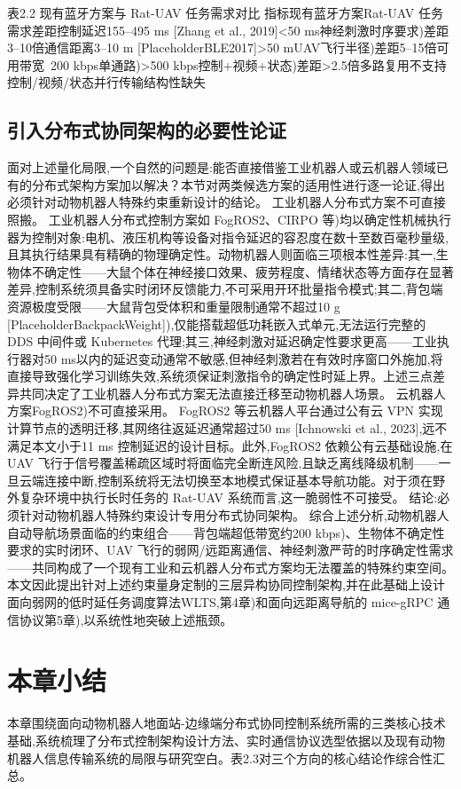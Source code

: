 表2.2 现有蓝牙方案与 Rat-UAV 任务需求对比
指标现有蓝牙方案Rat-UAV 任务需求差距控制延迟155–495 ms [Zhang et al., 2019]<50 ms神经刺激时序要求)差距3–10倍通信距离3–10 m [PlaceholderBLE2017]>50 mUAV飞行半径)差距5–15倍可用带宽~200 kbps单通路)>500 kbps控制+视频+状态)差距>2.5倍多路复用不支持控制/视频/状态并行传输结构性缺失

\subsection{引入分布式协同架构的必要性论证}
面对上述量化局限,一个自然的问题是:能否直接借鉴工业机器人或云机器人领域已有的分布式架构方案加以解决？本节对两类候选方案的适用性进行逐一论证,得出必须针对动物机器人特殊约束重新设计的结论。
工业机器人分布式方案不可直接照搬。 工业机器人分布式控制方案如 FogROS2、CIRPO 等)均以确定性机械执行器为控制对象:电机、液压机构等设备对指令延迟的容忍度在数十至数百毫秒量级,且其执行结果具有精确的物理确定性。动物机器人则面临三项根本性差异:其一,生物体不确定性——大鼠个体在神经接口效果、疲劳程度、情绪状态等方面存在显著差异,控制系统须具备实时闭环反馈能力,不可采用开环批量指令模式;其二,背包端资源极度受限——大鼠背包受体积和重量限制通常不超过10 g [PlaceholderBackpackWeight]),仅能搭载超低功耗嵌入式单元,无法运行完整的 DDS 中间件或 Kubernetes 代理;其三,神经刺激对延迟确定性要求更高——工业执行器对50 ms以内的延迟变动通常不敏感,但神经刺激若在有效时序窗口外施加,将直接导致强化学习训练失效,系统须保证刺激指令的确定性时延上界。上述三点差异共同决定了工业机器人分布式方案无法直接迁移至动物机器人场景。
云机器人方案FogROS2)不可直接采用。 FogROS2 等云机器人平台通过公有云 VPN 实现计算节点的透明迁移,其网络往返延迟通常超过50 ms [Ichnowski et al., 2023],远不满足本文小于11 ms 控制延迟的设计目标。此外,FogROS2 依赖公有云基础设施,在 UAV 飞行于信号覆盖稀疏区域时将面临完全断连风险,且缺乏离线降级机制——一旦云端连接中断,控制系统将无法切换至本地模式保证基本导航功能。对于须在野外复杂环境中执行长时任务的 Rat-UAV 系统而言,这一脆弱性不可接受。
结论:必须针对动物机器人特殊约束设计专用分布式协同架构。 综合上述分析,动物机器人自动导航场景面临的约束组合——背包端超低带宽约200 kbps)、生物体不确定性要求的实时闭环、UAV 飞行的弱网/远距离通信、神经刺激严苛的时序确定性需求——共同构成了一个现有工业和云机器人分布式方案均无法覆盖的特殊约束空间。本文因此提出针对上述约束量身定制的三层异构协同控制架构,并在此基础上设计面向弱网的低时延任务调度算法WLTS,第4章)和面向远距离导航的 mice-gRPC 通信协议第5章),以系统性地突破上述瓶颈。

\section{本章小结}
本章围绕面向动物机器人地面站-边缘端分布式协同控制系统所需的三类核心技术基础,系统梳理了分布式控制架构设计方法、实时通信协议选型依据以及现有动物机器人信息传输系统的局限与研究空白。表2.3对三个方向的核心结论作综合性汇总。

